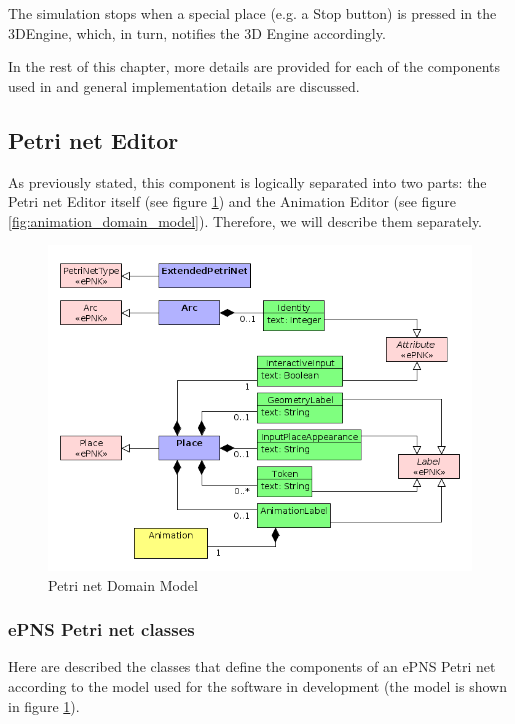 The simulation stops when a special place (e.g. a Stop button) is pressed in the 3DEngine, which, in
turn, notifies the 3D Engine accordingly.

In the rest of this chapter, more details are provided for each of the components used in \epns
and general implementation details are discussed.

\subsection{Petri net Editor}

As previously stated, this component is logically separated into two parts: the Petri
net Editor itself (see figure \ref{fig:petrinet_domain_model}) and the Animation Editor
(see figure \ref{fig:animation_domain_model}). Therefore, we will describe them separately.

\begin{figure}[ht]
   \begin{center}
       \includegraphics[scale=0.50]{image/dm_petrinet.png}
       \caption{Petri net Domain Model}
       \label{fig:petrinet_domain_model}
   \end{center}
\end{figure}

\subsubsection{ePNS Petri net classes}
\label{lst:pn_classes}
Here are described the classes that define the components of an ePNS Petri
net according to the model used for the software in development (the model is shown in
figure \ref{fig:petrinet_domain_model}).

